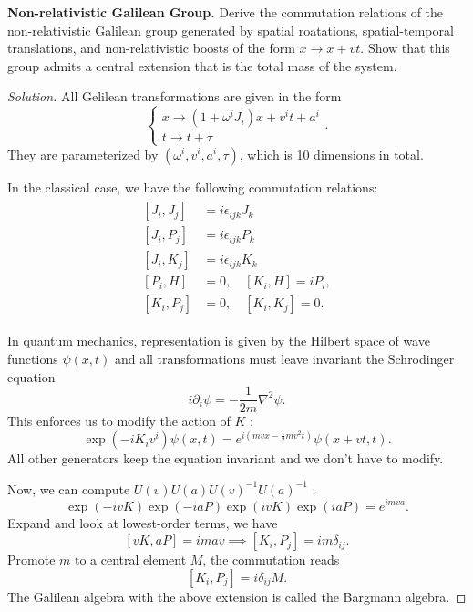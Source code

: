 \textbf{Non-relativistic Galilean Group.} Derive the commutation relations of the non-relativistic Galilean group generated by spatial roatations, spatial-temporal translations, and non-relativistic boosts of the form $x \to x + v t$. Show that this group admits a central extension that is the total mass of the system.

\begin{proof}[Solution]
	All Gelilean transformations are given in the form
	\[
		\begin{cases}
			 x \to (1 + \omega^i J_i) x + v^i t + a^i \\
			 t \to  t + \tau
		\end{cases}
	.\] 
	They are parameterized by $(\omega^i, v^i, a^i, \tau)$, which is 10 dimensions in total.

	In the classical case, we have the following commutation relations:	
	\begin{align}
\begin{aligned}
{\left[J_i, J_j\right] } & =i \epsilon_{i j k} J_k \\
{\left[J_i, P_j\right] } & =i \epsilon_{i j k} P_k \\
{\left[J_i, K_j\right] } & =i \epsilon_{i j k} K_k \\
{\left[P_i, H\right] } & =0, \quad\left[K_i, H\right]=i P_i, \\
{\left[K_i, P_j\right] } & =0, \quad\left[K_i, K_j\right]=0 .
\end{aligned}
\end{align}

In quantum mechanics, representation is given by the Hilbert space of wave functions $\psi(x, t)$ and all transformations must leave invariant the Schrodinger equation
\[
	i \partial_t \psi = - \frac{1}{2 m} \nabla ^2 \psi
.\] 
This enforces us to modify the action of $K$ :
\[
	\exp \left( - i K_i v^i \right) \psi(x,t)
	= e^{i ( m v x - \frac{1}{2} m v^2 t)} \psi(x + v t, t)
.\] 
All other generators keep the equation invariant and we don't have to modify.

Now, we can compute $U(v) U(a) U(v)^{-1} U(a)^{-1}$ :
\[
	\exp \left( - i v K \right) \exp \left( - i a P \right) \exp \left( i v K \right) \exp \left( i a P \right) = e^{i m v a}
.\] 
Expand and look at lowest-order terms, we have
\[
	[v K, a P] = i m a v \implies [K_i, P_j] =i m \delta_{i j} 
.\] 
Promote $m$ to a central element $M$, the commutation reads
\[
	[K_i, P_j] = i \delta_{i j} M
.\] 
The Galilean algebra with the above extension is called the Bargmann algebra.
\end{proof}

